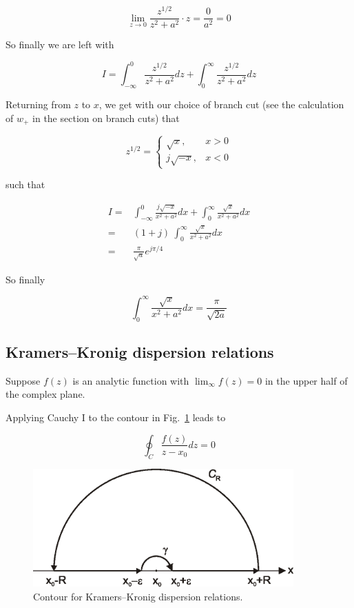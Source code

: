 \begin{equation}
\lim_{z \to 0}\frac{z^{1/2}}{z^2+a^2} \cdot z = \frac{0}{a^2} = 0
\end{equation}

So finally we are left with

\begin{equation}
I = \int_{- \infty}^{0}\frac{z^{1/2}}{z^2+a^2}dz + 
\int_{0}^{\infty}\frac{z^{1/2}}{z^2+a^2}dz
\end{equation} 

Returning from $z$ to $x$, we get with our choice of branch cut (see the
calculation of $w_+$ in the section on branch cuts) that 

\begin{equation}
z^{1/2} = 
\begin{cases}
\sqrt{x}, & x > 0\\
j \sqrt{-x}, & x < 0
\end{cases}
\end{equation} 

such that

\begin{align}
I = & \int_{- \infty}^{0}\frac{j\sqrt{-x}}{x^2+a^2}dx +
\int_{0}^{\infty}\frac{\sqrt{x}}{x^2+a^2}dx \nonumber \\
 = & (1 + j) \ \int_{0}^{\infty}\frac{\sqrt{x}}{x^2+a^2}dx \nonumber \\
 = & \frac{\pi}{\sqrt{a}} e^{j \pi /4}
\end{align} 

So finally

\begin{equation}
\int_0^{\infty}\frac{\sqrt{x}}{x^2+a^2}dx = \frac{\pi}{\sqrt{2a}}
\end{equation}

\subsection*{Kramers--Kronig dispersion relations}

Suppose $f(z)$ is an analytic function with $\lim_\infty f(z) = 0$ in the upper
half of the complex plane.

Applying Cauchy I to the contour in Fig.~\ref{fig-KK} leads to

\begin{equation}
\oint_{{C}} \frac{f(z)}{z-x_0} dz = 0
\end{equation}

\begin{figure}
\centering
\includegraphics[width=10cm]{complex/figures/kk}
\caption{Contour for Kramers--Kronig dispersion relations.}
\label{fig-KK}
\end{figure}

